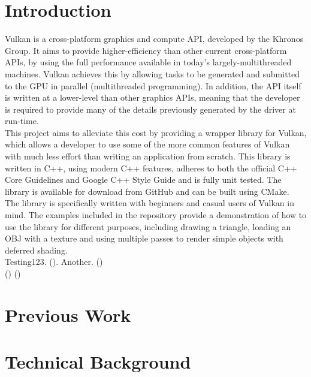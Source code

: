 \documentclass[12pt]{report}
\newcommand{\citebu}[1]{\citeauthor{#1} (\citeyear{#1})}
\theoremstyle{definition}
\begin{document}
  \listoffigures

  \chapter{Introduction}
    Vulkan is a cross-platform graphics and compute API, developed by the
    Khronos Group. It aims to provide higher-efficiency than other current
    cross-platform APIs, by using the full performance available in today's
    largely-multithreaded machines. Vulkan achieves this by allowing tasks to be
    generated and submitted to the GPU in parallel (multithreaded programming).
    In addition, the API itself is written at a lower-level than other graphics
    APIs, meaning that the developer is required to provide many of the details
    previously generated by the driver at run-time.\\

    This project aims to alleviate this cost by providing a wrapper library for
    Vulkan, which allows a developer to use some of the more common features of
    Vulkan with much less effort than writing an application from scratch. This
    library is written in C++, using modern C++ features, adheres to both the
    official C++ Core Guidelines and Google C++ Style Guide and is fully unit
    tested. The library is available for download from GitHub and can be built
    using CMake.\\

    The library is specifically written with beginners and casual users of
    Vulkan in mind. The examples included in the repository provide a
    demonstration of how to use the library for different purposes, including
    drawing a triangle, loading an OBJ with a texture and using multiple passes
    to render simple objects with deferred shading.\\

    Testing123. \citebu{attiya1995sharing}. Another. \citebu{beyer2016site} \\

    \citebu{renderdoc} \citebu{gameEngineBook}

  \chapter{Previous Work}

  \chapter{Technical Background}
\end{document}
